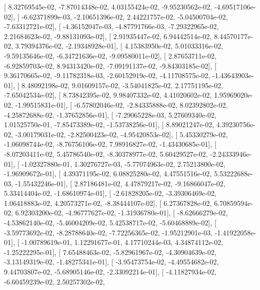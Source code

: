 \documentclass{article}
\begin{document}
       [  8.32769545e-02,  -7.87014348e-02,   4.03155424e-02,
         -9.95230562e-02,  -4.69517106e-02],
       [ -6.62371899e-03,  -2.10651396e-02,   2.44221757e-02,
         -5.04500704e-02,  -7.63312721e-02],
       [ -4.36152047e-03,  -4.87791766e-03,  -7.29322965e-02,
          2.21684623e-02,  -9.88131093e-02],
       [  2.91935447e-02,   6.94442514e-02,   8.44570177e-02,
          3.79394376e-02,  -2.19348928e-01],
       [  4.15383950e-02,   5.01033316e-02,  -9.59135646e-02,
         -6.34721636e-02,  -9.09580011e-02],
       [  2.87653711e-02,  -6.92859703e-02,   8.94313420e-02,
         -7.09191137e-02,  -9.84303185e-02],
       [  9.36170665e-02,  -9.11782318e-03,  -2.60152919e-02,
         -4.11708575e-02,  -1.43643903e-01],
       [  8.48092198e-02,   9.01609157e-02,  -3.54041825e-02,
          2.17751195e-02,  -7.65042534e-02],
       [  8.73842395e-02,   9.98407332e-02,   4.41020602e-02,
          1.95969020e-02,  -1.99515831e-01],
       [ -6.57802046e-02,  -2.84335888e-02,   8.02392802e-02,
         -4.25872688e-02,  -1.37652856e-01],
       [ -7.29065228e-03,   5.27609340e-02,   1.01525750e-01,
         -7.85473389e-02,  -1.53738256e-01],
       [  8.89021247e-02,   4.39230756e-02,  -3.00179031e-02,
         -2.82500423e-02,  -4.95420853e-02],
       [  5.45330279e-02,  -1.06098744e-02,  -8.76756106e-02,
          7.98916827e-02,  -1.43430685e-01],
       [ -8.07203411e-02,   5.45786540e-02,  -8.30378977e-02,
          5.60429527e-02,  -2.24333946e-01],
       [ -1.02327880e-01,   1.30276727e-03,  -5.77074963e-02,
          2.75213800e-02,  -1.96909672e-01],
       [  4.39371195e-02,   6.08825280e-02,   4.47551516e-02,
          5.53222688e-03,  -1.55432246e-01],
       [  2.87186481e-02,   4.47879217e-02,  -9.16866047e-02,
          5.33414404e-02,  -1.68610974e-01],
       [ -2.61828205e-02,  -3.39306469e-02,   1.06418883e-02,
          4.20573271e-02,  -8.38444107e-02],
       [  6.27367828e-02,   6.70859594e-02,   6.92303200e-02,
         -4.96777627e-02,  -1.31936780e-01],
       [ -8.62666279e-02,  -4.53862140e-02,  -5.46004209e-02,
          5.42538717e-02,  -5.60468889e-02],
       [ -3.59773692e-02,  -8.28788640e-02,  -7.72256365e-02,
         -1.95212901e-03,  -1.41922058e-01],
       [ -1.00789619e-01,   1.12291677e-01,   4.17710244e-03,
          4.34874112e-02,  -1.25222295e-01],
       [  7.65488463e-02,  -5.82961967e-02,  -4.30904639e-02,
         -3.13149319e-02,  -1.48275341e-01],
       [ -3.95473754e-02,  -4.49554682e-02,   9.44703807e-02,
         -5.68905146e-02,  -2.33092214e-01],
       [ -4.11827934e-02,  -6.60459239e-02,   2.50257302e-02,
\end{document}

